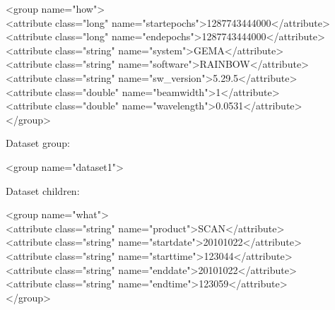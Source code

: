\documentclass[11p]{article}
\begin{document}
\begin{kod}
    <group name="how">\\
\hspace*{0.5cm}<attribute class="long" name="startepochs">1287743444000</attribute>\\
\hspace*{0.5cm}<attribute class="long" name="endepochs">1287743444000</attribute>\\
\hspace*{0.5cm}<attribute class="string" name="system">GEMA</attribute>\\
\hspace*{0.5cm}<attribute class="string" name="software">RAINBOW</attribute>\\
\hspace*{0.5cm}<attribute class="string" name="sw\_version">5.29.5</attribute>\\
\hspace*{0.5cm}<attribute class="double" name="beamwidth">1</attribute>\\
\hspace*{0.5cm}<attribute class="double" name="wavelength">0.0531</attribute>\\
    </group>\\
\end{kod}
Dataset group:
\begin{kod}
<group name="dataset1">\\
\end{kod}
Dataset children:
\begin{kod}
        <group name="what">\\
\hspace*{0.5cm}<attribute class="string" name="product">SCAN</attribute>\\
\hspace*{0.5cm}<attribute class="string" name="startdate">20101022</attribute>\\
\hspace*{0.5cm}<attribute class="string" name="starttime">123044</attribute>\\
\hspace*{0.5cm}<attribute class="string" name="enddate">20101022</attribute>\\
\hspace*{0.5cm}<attribute class="string" name="endtime">123059</attribute>\\
        </group>\\
\end{kod}
\end{document}
